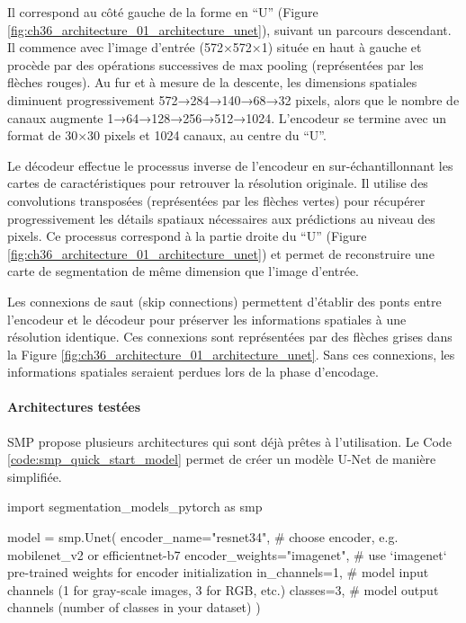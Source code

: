 Il correspond au côté gauche de la forme en ``U'' (Figure \ref{fig:ch36_architecture_01_architecture_unet}), suivant un parcours descendant. Il commence avec l'image d'entrée (572×572×1) située en haut à gauche et procède par des opérations successives de max pooling (représentées par les flèches rouges). Au fur et à mesure de la descente, les dimensions spatiales diminuent progressivement 572→284→140→68→32 pixels, alors que le nombre de canaux augmente 1→64→128→256→512→1024. L'encodeur se termine avec un format de 30×30 pixels et 1024 canaux, au centre du ``U''.

Le décodeur effectue le processus inverse de l'encodeur en sur-échantillonnant les cartes de caractéristiques pour retrouver la résolution originale. Il utilise des convolutions transposées (représentées par les flèches vertes) pour récupérer progressivement les détails spatiaux nécessaires aux prédictions au niveau des pixels. Ce processus correspond à la partie droite du ``U'' (Figure \ref{fig:ch36_architecture_01_architecture_unet}) et permet de reconstruire une carte de segmentation de même dimension que l'image d'entrée.

Les connexions de saut (skip connections) permettent d'établir des ponts entre l'encodeur et le décodeur pour préserver les informations spatiales à une résolution identique. Ces connexions sont représentées par des flèches grises dans la Figure \ref{fig:ch36_architecture_01_architecture_unet}. Sans ces connexions, les informations spatiales seraient perdues lors de la phase d'encodage.

\paragraph{Architectures testées}
SMP propose plusieurs architectures qui sont déjà prêtes à l'utilisation. Le Code \ref{code:smp_quick_start_model} permet de créer un modèle U-Net de manière simplifiée.

\begin{code}[H]
    \begin{pythoncode}
    import segmentation_models_pytorch as smp
    
    model = smp.Unet(
        encoder_name="resnet34",        # choose encoder, e.g. mobilenet_v2 or efficientnet-b7
        encoder_weights="imagenet",     # use `imagenet` pre-trained weights for encoder initialization
        in_channels=1,                  # model input channels (1 for gray-scale images, 3 for RGB, etc.)
        classes=3,                      # model output channels (number of classes in your dataset)
    )
    \end{pythoncode}
    \label{code:smp_quick_start_model}
\end{code}


